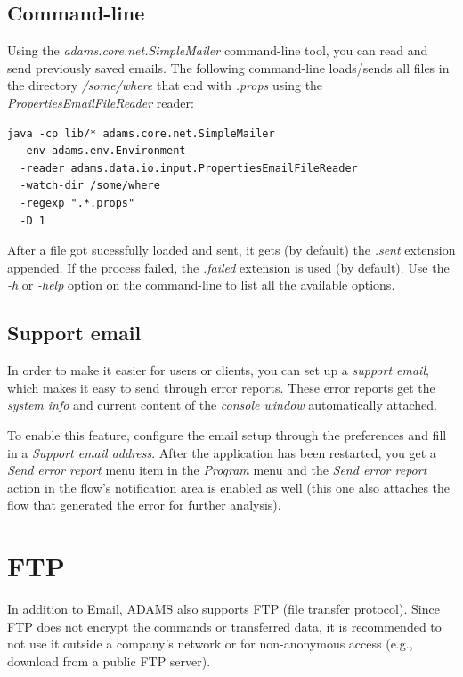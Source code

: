 \documentclass[a4paper]{book}
\begin{document}
\section{Command-line}
Using the \textit{adams.core.net.SimpleMailer} command-line tool, you can read
and send previously saved emails. The following command-line loads/sends all 
files in the directory \textit{/some/where} that end with \textit{.props} using the
\textit{PropertiesEmailFileReader} reader:
\begin{verbatim}
java -cp lib/* adams.core.net.SimpleMailer
  -env adams.env.Environment
  -reader adams.data.io.input.PropertiesEmailFileReader
  -watch-dir /some/where
  -regexp ".*.props"
  -D 1
\end{verbatim}
After a file got sucessfully loaded and sent, it gets (by default) the 
\textit{.sent} extension appended. If the process failed, the \textit{.failed}
extension is used (by default).
Use the \textit{-h} or \textit{-help} option on the command-line to list all 
the available options.

\section{Support email}
In order to make it easier for users or clients, you can set up a
\textit{support email}, which makes it easy to send through error reports.
These error reports get the \textit{system info} and current content
of the \textit{console window} automatically attached.

To enable this feature, configure the email setup through the preferences
and fill in a \textit{Support email address}. After the application has
been restarted, you get a \textit{Send error report} menu item in the
\textit{Program} menu and the \textit{Send error report} action in the flow's
notification area is enabled as well (this one also attaches the flow that
generated the error for further analysis).



\chapter{FTP}
In addition to Email, ADAMS also supports FTP (file transfer protocol). Since
FTP does not encrypt the commands or transferred data, it is recommended to not
use it outside a company's network or for non-anonymous access (e.g., download
from a public FTP server).
\end{document}
